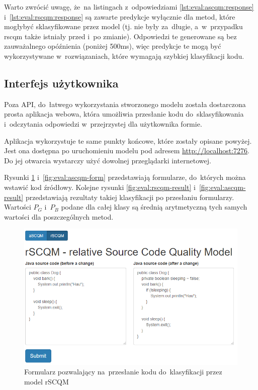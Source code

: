\documentclass[twoside]{praca}
\begin{document}
Warto zwrócić uwagę, że~na listingach z~odpowiedziami \ref{lst:eval:ascqm:response} i~\ref{lst:eval:rscqm:response} są zawarte predykcje wyłącznie dla metod, które mogłybyć sklasyfikowane przez model (tj. nie były za~długie, a~w~przypadku \gls{rscqm} także istniały przed i~po zmianie). Odpowiedzi te generowane są bez zauważalnego opóźnienia (poniżej 500ms), więc predykcje te mogą być wykorzystywane w~rozwiązaniach, które wymagają szybkiej klasyfikacji kodu.

\subsection{Interfejs użytkownika}

Poza API, do~łatwego wykorzystania stworzonego modelu została dostarczona prosta aplikacja webowa, która umożliwia przesłanie kodu do~sklasyfikowania i~odczytania odpowiedzi w~przejrzystej dla użytkownika formie. 

Aplikacja wykorzystuje te same punkty końcowe, które zostały opisane powyżej. Jest ona dostępna po uruchomieniu modelu pod adresem \url{http://localhost:7276}. Do jej otwarcia wystarczy użyć dowolnej przeglądarki internetowej.

Rysunki \ref{fig:eval:rscqm-form} i~\ref{fig:eval:ascqm-form} przedstawiają formularze, do~których można wstawić kod źródłowy. Kolejne rysunki \ref{fig:eval:rscqm-result} i~\ref{fig:eval:ascqm-result} przedstawiają rezultaty takiej klasyfikacji po przesłaniu formularzy. Wartości $P_G$ i~$P_B$ podane dla całej klasy są średnią arytmetyczną tych samych wartości dla poszczególnych metod.

\begin{figure}[h!]
\centering
\includegraphics[width=\textwidth]{eval/rscqm-form.png}
\caption{Formularz pozwalający na~przesłanie kodu do~klasyfikacji przez model rSCQM}
\label{fig:eval:rscqm-form}
\end{figure}
\end{document}
